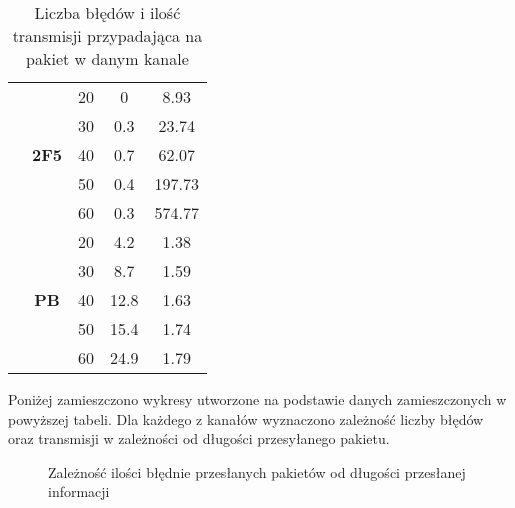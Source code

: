 \documentclass{article}
\begin{document}
\begin{table}[h!]
\begin{tabular}{|c|c|c|c|c|}
                               & \multirow{5}{*}{\textbf{2F5}} & 20                     & 0                      & 8.93                              \\ \cline{3-5} 
                               &                               & 30                     & 0.3                    & 23.74                             \\ \cline{3-5} 
                               &                               & 40                     & 0.7                    & 62.07                             \\ \cline{3-5} 
                               &                               & 50                     & 0.4                    & 197.73                            \\ \cline{3-5} 
                               &                               & 60                     & 0.3                    & 574.77                            \\ \cline{2-5} 
                               & \multirow{5}{*}{\textbf{PB}}  & 20                     & 4.2                    & 1.38                              \\ \cline{3-5} 
                               &                               & 30                     & 8.7                    & 1.59                              \\ \cline{3-5} 
                               &                               & 40                     & 12.8                   & 1.63                              \\ \cline{3-5} 
                               &                               & 50                     & 15.4                   & 1.74                              \\ \cline{3-5} 
                               &                               & 60                     & 24.9                   & 1.79                              \\ \hline
\end{tabular}
\caption{Liczba błędów i ilość transmisji przypadająca na pakiet w danym kanale}
\end{table}

\noindent
Poniżej zamieszczono wykresy utworzone na podstawie danych zamieszczonych w powyższej tabeli. Dla każdego z kanałów wyznaczono zależność liczby błędów oraz transmisji w zależności od długości przesyłanego pakietu.

\begin{figure}[h!]
\centering
{}
\qquad 
{}
\caption{Zależność ilości błędnie przesłanych pakietów od długości przesłanej informacji}
\end{figure}
\end{document}
